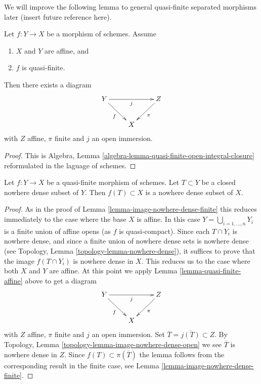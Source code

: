 \noindent
We will improve the following lemma to general quasi-finite separated
morphisms later (insert future reference here).

\begin{lemma}
\label{lemma-quasi-finite-affine}
Let $f : Y \to X$ be a morphism of schemes.
Assume
\begin{enumerate}
\item $X$ and $Y$ are affine, and
\item $f$ is quasi-finite.
\end{enumerate}
Then there exists a diagram
$$
\xymatrix{
Y \ar[rd]_f \ar[rr]_{j} & & Z \ar[ld]^\pi \\
& X &
}
$$
with $Z$ affine, $\pi$ finite and $j$ an open immersion.
\end{lemma}

\begin{proof}
This is
Algebra, Lemma \ref{algebra-lemma-quasi-finite-open-integral-closure}
reformulated in the laguage of schemes.
\end{proof}

\begin{lemma}
\label{lemma-image-nowhere-dense-quasi-finite}
Let $f : Y \to X$ be a quasi-finite morphism of schemes.
Let $T \subset Y$ be a closed nowhere dense subset of $Y$.
Then $f(T) \subset X$ is a nowhere dense subset of $X$.
\end{lemma}

\begin{proof}
As in the proof of Lemma \ref{lemma-image-nowhere-dense-finite} this
reduces immediately to the case where the base $X$ is affine.
In this case $Y = \bigcup_{i = 1, \ldots, n} Y_i$ is a finite union
of affine opens (as $f$ is quasi-compact). Since each $T \cap Y_i$
is nowhere dense, and since a finite union of nowhere dense sets is
nowhere dense (see
Topology, Lemma \ref{topology-lemma-nowhere-dense}),
it suffices to prove that the image $f(T \cap Y_i)$ is nowhere dense in $X$.
This reduces us to the case where both $X$ and $Y$ are affine. At this point
we apply Lemma \ref{lemma-quasi-finite-affine} above to get a diagram
$$
\xymatrix{
Y \ar[rd]_f \ar[rr]_{j} & & Z \ar[ld]^\pi \\
& X &
}
$$
with $Z$ affine, $\pi$ finite and $j$ an open immersion.
Set $\overline{T} = \overline{j(T)} \subset Z$. By
Topology, Lemma \ref{topology-lemma-image-nowhere-dense-open}
we see $\overline{T}$ is nowhere dense in $Z$.
Since $f(T) \subset \pi(\overline{T})$
the lemma follows from the corresponding result in the finite case, see
Lemma \ref{lemma-image-nowhere-dense-finite}.
\end{proof}




